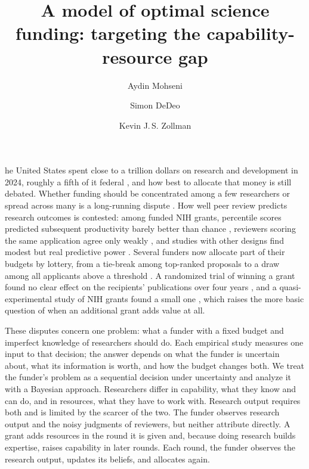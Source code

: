 \documentclass[9pt,twocolumn,twoside]{pnas-new}
\title{A model of optimal science funding: targeting the capability-resource gap}
\author[a,1]{Aydin Mohseni}
\author[b]{Simon DeDeo}
\author[a]{Kevin J.\,S. Zollman}
\affil[a]{Department of Philosophy, Carnegie Mellon University, Pittsburgh, PA 15213}
\affil[b]{Department of Social and Decision Sciences, Carnegie Mellon University, Pittsburgh, PA 15213}
\begin{document}
\maketitle
\thispagestyle{firststyle}
he United States spent close to a trillion dollars on research and development in 2024, roughly a fifth of it federal \citep{NCSES2026, NSB2026}, and how best to allocate that money is still debated. Whether funding should be concentrated among a few researchers or spread across many is a long-running dispute \citep{FortinCurrie2013, Mongeon2016, Aagaard2020, Lauer2021}. How well peer review predicts research outcomes is contested: among funded NIH grants, percentile scores predicted subsequent productivity barely better than chance \citep{Fang2016}, reviewers scoring the same application agree only weakly \citep{Pier2018}, and studies with other designs find modest but real predictive power \citep{LiAgha2015, ParkLeeKim2015, LindnerNakamura2015}. Several funders now allocate part of their budgets by lottery, from a tie-break among top-ranked proposals to a draw among all applicants above a threshold \citep{Liu2020, Heyard2022, Feliciani2024}. A randomized trial of winning a grant found no clear effect on the recipients' publications over four years \citep{Barnett2024}, and a quasi-experimental study of NIH grants found a small one \citep{JacobLefgren2011}, which raises the more basic question of when an additional grant adds value at all.

These disputes concern one problem: what a funder with a fixed budget and imperfect knowledge of researchers should do. Each empirical study measures one input to that decision; the answer depends on what the funder is uncertain about, what its information is worth, and how the budget changes both. We treat the funder's problem as a sequential decision under uncertainty and analyze it with a Bayesian approach. Researchers differ in capability, what they know and can do, and in resources, what they have to work with. Research output requires both and is limited by the scarcer of the two. The funder observes research output and the noisy judgments of reviewers, but neither attribute directly. A grant adds resources in the round it is given and, because doing research builds expertise, raises capability in later rounds. Each round, the funder observes the research output, updates its beliefs, and allocates again.
\end{document}
